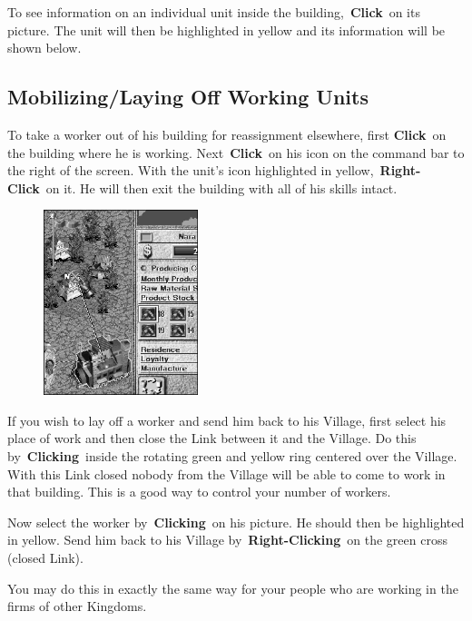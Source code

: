 To see information on an individual unit inside the building, \textbf{Click} on its picture. The unit will then be highlighted in yellow and its information will be shown below.

\subsection{Mobilizing/Laying Off Working Units}

To take a worker out of his building for reassignment elsewhere, first \textbf{Click} on the building where he is working. Next \textbf{Click} on his icon on the command bar to the right of the screen. With the unit’s icon highlighted in yellow, \textbf{Right-Click} on it. He will then exit the building with all of his skills intact.

\begin{figure}
	\vspace{-20pt}
	\begin{center}
		\includegraphics[width=0.4\textwidth]{Icloselink}
	\end{center}
	\vspace{-20pt}
\end{figure}

If you wish to lay off a worker and send him back to his Village, first select his place of work and then close the Link between it and the Village. Do this by \textbf{Clicking} inside the rotating green and yellow ring centered over the Village. With this Link closed nobody from the Village will be able to come to work in that building. This is a good way to control your number of workers.

Now select the worker by \textbf{Clicking} on his picture. He should then be highlighted in yellow. Send him back to his Village by \textbf{Right-Clicking} on the green cross (closed Link).

You may do this in exactly the same way for your people who are working in the firms of other Kingdoms.

